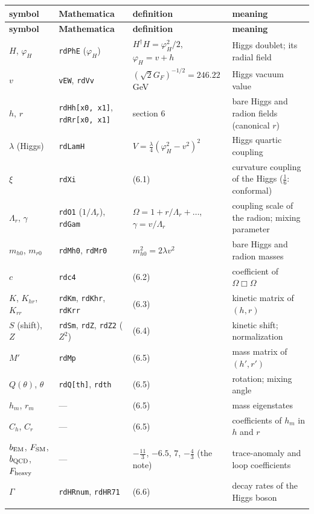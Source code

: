 \documentclass[10pt,a4paper]{article}
\begin{document}
{\footnotesize
\begin{longtable}{>{\raggedright\arraybackslash}p{}>{\raggedright\arraybackslash}p{}>{\raggedright\arraybackslash}p{}>{\raggedright\arraybackslash}p{}}
\toprule
\textbf{symbol} & \textbf{Mathematica} & \textbf{definition} & \textbf{meaning} \\
\midrule\endfirsthead
\toprule
\textbf{symbol} & \textbf{Mathematica} & \textbf{definition} & \textbf{meaning} \\
\midrule\endhead
\endfoot
\bottomrule\endlastfoot
$H$, $\varphi_H$ & \texttt{rdPhE} ($\varphi_H$) & $H^\dagger H=\varphi_H^2/2$, $\varphi_H=v+h$ & Higgs doublet; its radial field \\
$v$ & \texttt{vEW}, \texttt{rdVv} & $(\sqrt2G_F)^{-1/2}=246.22$ GeV & Higgs vacuum value \\
$h$, $r$ & \texttt{rdHh[x0, x1]}, \texttt{rdRr[x0, x1]} & section 6 & bare Higgs and radion fields (canonical $r$) \\
$\lambda$ (Higgs) & \texttt{rdLamH} & $V=\frac\lambda4(\varphi_H^2-v^2)^2$ & Higgs quartic coupling \\
$\xi$ & \texttt{rdXi} & (6.1) & curvature coupling of the Higgs ($\frac16$: conformal) \\
$\Lambda_r$, $\gamma$ & \texttt{rdO1} ($1/\Lambda_r$), \texttt{rdGam} & $\Omega=1+r/\Lambda_r+\dots$, $\gamma=v/\Lambda_r$ & coupling scale of the radion; mixing parameter \\
$m_{h0}$, $m_{r0}$ & \texttt{rdMh0}, \texttt{rdMr0} & $m_{h0}^2=2\lambda v^2$ & bare Higgs and radion masses \\
$c$ & \texttt{rdc4} & (6.2) & coefficient of $\Omega\Box\Omega$ \\
$K$, $K_{hr}$, $K_{rr}$ & \texttt{rdKm}, \texttt{rdKhr}, \texttt{rdKrr} & (6.3) & kinetic matrix of $(h,r)$ \\
$S$ (shift), $Z$ & \texttt{rdSm}, \texttt{rdZ}, \texttt{rdZ2} ($Z^2$) & (6.4) & kinetic shift; normalization \\
$M'$ & \texttt{rdMp} & (6.5) & mass matrix of $(h',r')$ \\
$Q(\theta)$, $\theta$ & \texttt{rdQ[th]}, \texttt{rdth} & (6.5) & rotation; mixing angle \\
$h_m$, $r_m$ & — & (6.5) & mass eigenstates \\
$C_h$, $C_r$ & — & (6.5) & coefficients of $h_m$ in $h$ and $r$ \\
$b_{\rm EM}$, $F_{\rm SM}$, $b_{\rm QCD}$, $F_{\rm heavy}$ & — & $-\frac{11}3$, $-6.5$, $7$, $-\frac43$ (the note) & trace-anomaly and loop coefficients \\
$\Gamma$ & \texttt{rdHRnum}, \texttt{rdHR71} & (6.6) & decay rates of the Higgs boson \\*
\end{longtable}}
\end{document}
